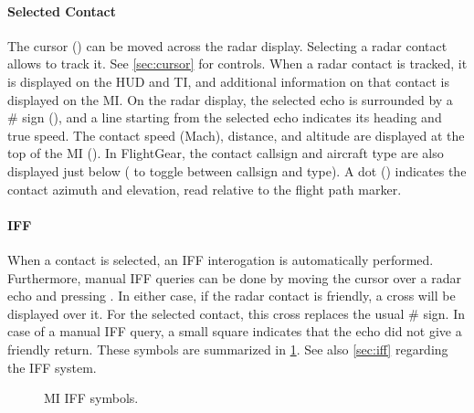 \paragraph{Selected Contact}
The cursor () can be moved across the radar display.
Selecting a radar contact allows to track it. See \cref{sec:cursor} for controls.
When a radar contact is tracked, it is displayed on the HUD and TI,
and additional information on that contact is displayed on the MI.
On the radar display, the selected echo is surrounded by a \# sign (),
and a line starting from the selected echo indicates its heading and true speed.
The contact speed (Mach), distance, and altitude are displayed
at the top of the MI ().
In FlightGear, the contact callsign and aircraft type are also displayed just below
( to toggle between callsign and type).
A dot () indicates the contact azimuth and elevation,
read relative to the flight path marker.

\paragraph{IFF}
When a contact is selected, an IFF interogation is automatically performed.
Furthermore, manual IFF queries can be done by moving the cursor over a radar echo and pressing .
In either case, if the radar contact is friendly, a cross will be displayed over it.
For the selected contact, this cross replaces the usual \# sign.
In case of a manual IFF query, a small square indicates that the echo did not give a friendly return.
These symbols are summarized in \cref{fig:mi-iff}.
See also \cref{sec:iff} regarding the IFF system.

\begin{figure}

  \caption{MI IFF symbols.}
  \label{fig:mi-iff}
\end{figure}

